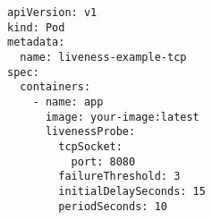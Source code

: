 \begin{verbatim}
apiVersion: v1
kind: Pod
metadata:
  name: liveness-example-tcp
spec:
  containers:
    - name: app
      image: your-image:latest
      livenessProbe:
        tcpSocket:
          port: 8080
        failureThreshold: 3
        initialDelaySeconds: 15
        periodSeconds: 10
\end{verbatim}